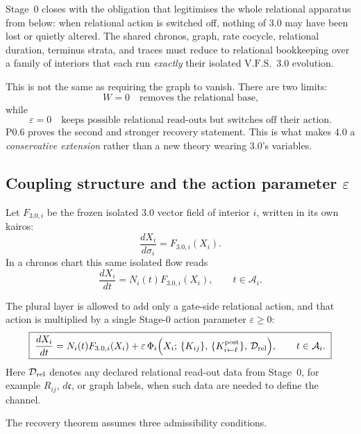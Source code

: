 \documentclass[11pt,a4paper]{article}
\newcommand{\VFS}{\ensuremath{\mathrm{V.F.S.}}}
\theoremstyle{definition}
\theoremstyle{plain}
\theoremstyle{remark}
\begin{document}
Stage~0 closes with the obligation that legitimises the whole relational apparatus
from below: when relational action is switched off, nothing of 3.0 may have been
lost or quietly altered. The shared chronos, graph, rate cocycle, relational
duration, terminus strata, and traces must reduce to relational bookkeeping over
a family of interiors that each run \emph{exactly} their isolated \VFS\ 3.0
evolution.

This is not the same as requiring the graph to vanish. There are two limits:
\[
W=0
\quad
\text{removes the relational base,}
\]
while
\[
\varepsilon=0
\quad
\text{keeps possible relational read-outs but switches off their action.}
\]
P0.6 proves the second and stronger recovery statement. This is what makes 4.0 a
\emph{conservative extension} rather than a new theory wearing 3.0's variables.

\subsection{Coupling structure and the action parameter
\texorpdfstring{\(\varepsilon\)}{epsilon}}

Let \(F_{3.0,i}\) be the frozen isolated 3.0 vector field of interior \(i\), written
in its own kairos:
\[
\frac{dX_i}{d\sigma_i}
=
F_{3.0,i}(X_i).
\]
In a chronos chart this same isolated flow reads
\[
\frac{dX_i}{dt}
=
N_i(t)F_{3.0,i}(X_i),
\qquad
t\in\mathcal A_i.
\]

The plural layer is allowed to add only a gate-side relational action, and that
action is multiplied by a single Stage-0 action parameter \(\varepsilon\ge0\):
\[
\boxed{\;
\frac{dX_i}{dt}
=
N_i(t)F_{3.0,i}(X_i)
+
\varepsilon\,
\Phi_i
\Bigl(
X_i;\,
\{K_{ij}\},\,
\{K^{\rm post}_{i\leftarrow\ell}\},\,
\mathcal D_{\rm rel}
\Bigr),
\qquad
t\in\mathcal A_i.
\;}
\]
Here \(\mathcal D_{\rm rel}\) denotes any declared relational read-out data from
Stage~0, for example \(R_{ij}\), \(d\mathfrak c\), or graph labels, when such data
are needed to define the channel.

The recovery theorem assumes three admissibility conditions.
\end{document}

